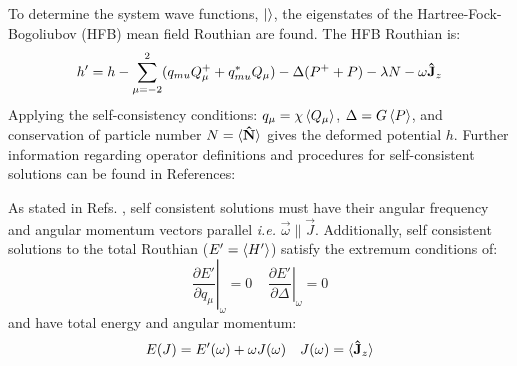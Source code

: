To determine the system wave functions,  $\ket{}$, the eigenstates of the Hartree-Fock-Bogoliubov (HFB) mean field Routhian are found. The HFB Routhian is:
\begin{equation}
\label{eqn:chp2-TAC-HFB-Routhian}
h'=h - \sum\limits_{\mu=-2}^{2}(q_{mu}Q^+_{\mu}+q^*_{mu}Q_{\mu}) - \Delta(P^++P) - \lambda{}N-\omega\boldsymbol{\hat{\textbf{J}}}_z
\end{equation}
Applying the self-consistency conditions: $q_{\mu}=\chi{}\braket{Q_{\mu}}$, $\Delta=G\braket{P}$, and conservation of particle number $N=\braket{\boldsymbol{\hat{\textbf{N}}}}$ gives the deformed potential $h$. Further information regarding operator definitions and procedures for self-consistent solutions can be found in References: \cite{frauendorfTAC,frauendorfTACMultiQPBands,nuclearManyBodyProblem}

As stated in Refs. \cite{timeDepVarMethodForRotation,frauendorfTACMultiQPBands}, self consistent solutions must have their angular frequency and angular momentum vectors parallel \emph{i.e.} $\vec{\omega}\parallel\vec{J}$. Additionally, self consistent solutions to the total Routhian ($E'=\braket{H'}$) satisfy the extremum conditions of:
\begin{equation}
\label{eqn:chp2-tac-extrema-cond}
\left. \frac{\partial{}E'}{\partial{}q_{\mu}} \right|_{\omega}=0 ~~~~~ \left. \frac{\partial{}E'}{\partial{}\Delta} \right|_{\omega}=0
\end{equation}
and have total energy and angular momentum:
\begin{align}
E(J)=E'(\omega)+\omega{}J(\omega) & & J(\omega) = \braket{\boldsymbol{\hat{\textbf{J}}}_z}
\end{align}

